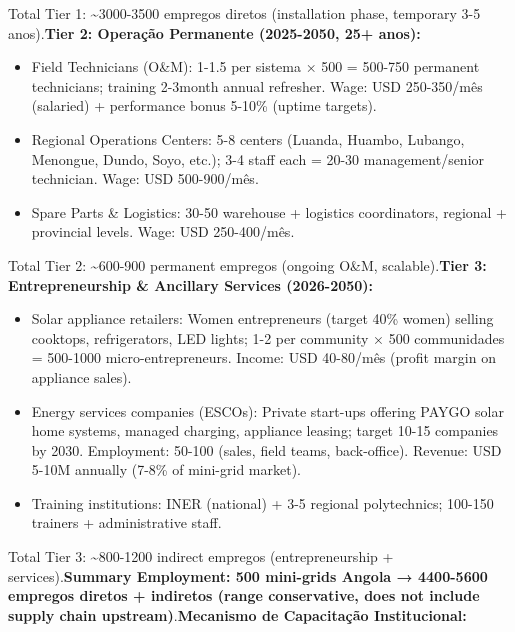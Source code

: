 \documentclass[12pt, a4paper]{article}
\begin{document}
Total Tier 1: \textasciitilde{}3000-3500 empregos diretos (installation phase, temporary 3-5 anos).\textbf{Tier 2: Operação Permanente (2025-2050, 25+ anos):}
\begin{itemize}
\item Field Technicians (O\&M): 1-1.5 per sistema × 500 = 500-750 permanent technicians; training 2-3month annual refresher. Wage: USD 250-350/mês (salaried) + performance bonus 5-10\% (uptime targets).

\item Regional Operations Centers: 5-8 centers (Luanda, Huambo, Lubango, Menongue, Dundo, Soyo, etc.); 3-4 staff each = 20-30 management/senior technician. Wage: USD 500-900/mês.

\item Spare Parts \& Logistics: 30-50 warehouse + logistics coordinators, regional + provincial levels. Wage: USD 250-400/mês.
\end{itemize}

Total Tier 2: \textasciitilde{}600-900 permanent empregos (ongoing O\&M, scalable).\textbf{Tier 3: Entrepreneurship \& Ancillary Services (2026-2050):}
\begin{itemize}
\item Solar appliance retailers: Women entrepreneurs (target 40\% women) selling cooktops, refrigerators, LED lights; 1-2 per community × 500 communidades = 500-1000 micro-entrepreneurs. Income: USD 40-80/mês (profit margin on appliance sales).

\item Energy services companies (ESCOs): Private start-ups offering PAYGO solar home systems, managed charging, appliance leasing; target 10-15 companies by 2030. Employment: 50-100 (sales, field teams, back-office). Revenue: USD 5-10M annually (7-8\% of mini-grid market).

\item Training institutions: INER (national) + 3-5 regional polytechnics; 100-150 trainers + administrative staff.
\end{itemize}

Total Tier 3: \textasciitilde{}800-1200 indirect empregos (entrepreneurship + services).\textbf{Summary Employment: 500 mini-grids Angola → 4400-5600 empregos diretos + indiretos (range conservative, does not include supply chain upstream)}.\textbf{Mecanismo de Capacitação Institucional:}
\end{document}
